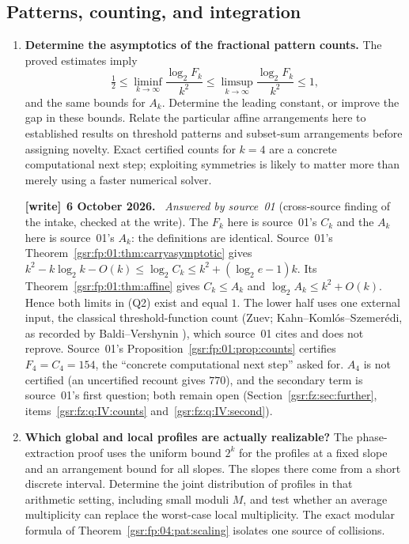 \documentclass[11pt,letterpaper]{article}
\numberwithin{equation}{section}
\theoremstyle{definition}
\theoremstyle{remark}
\newcommand{\1}{\mathbf 1}
\newenvironment{writenote}[1][]{\par\smallskip\begingroup\small
 \noindent\textbf{[write]}\if\relax\detokenize{#1}\relax\else~\textbf{#1.}\fi\ }%
 {\par\endgroup\smallskip}
\begin{document}
\subsection{Patterns, counting, and integration}

\begin{enumerate}[label=\textbf{Q\arabic*.},leftmargin=2.6em,resume]
\item \textbf{Determine the asymptotics of the fractional pattern counts.}
The proved estimates imply
\[
 \tfrac12
 \leq\liminf_{k\to\infty}\frac{\log_2 F_k}{k^2}
 \leq\limsup_{k\to\infty}\frac{\log_2 F_k}{k^2}
 \leq1,
 \tag{Q2}
\]
and the same bounds for \(A_k\).
Determine the leading constant, or improve the gap in these bounds.
Relate the particular affine arrangements here to established results
on threshold patterns and subset-sum arrangements before assigning
novelty.  Exact certified counts for \(k=4\) are a concrete computational
next step; exploiting symmetries is likely to matter more than merely
using a faster numerical solver.
\begin{writenote}[6 October 2026]
\emph{Answered by source~01} (cross-source finding of the intake, checked at the write). The $F_k$ here is source~01's $C_k$ and the $A_k$ here is source~01's $A_k$: the definitions are identical. Source~01's Theorem~\ref{gsr:fp:01:thm:carryasymptotic} gives $k^2-k\log_2k-O(k)\le\log_2C_k\le k^2+(\log_2e-1)k$. Its Theorem~\ref{gsr:fp:01:thm:affine} gives $C_k\le A_k$ and $\log_2A_k\le k^2+O(k)$. Hence both limits in (Q2) exist and equal $1$. The lower half uses one external input, the classical threshold-function count (Zuev; Kahn--Koml\'os--Szemer\'edi, as recorded by Baldi--Vershynin \cite{bv}), which source~01 cites and does not reprove. Source~01's Proposition~\ref{gsr:fp:01:prop:counts} certifies $F_4=C_4=154$, the ``concrete computational next step'' asked for. $A_4$ is not certified (an uncertified recount gives $770$), and the secondary term is source~01's first question; both remain open (Section~\ref{gsr:fz:sec:further}, items~\ref{gsr:fz:q:IV:counts} and~\ref{gsr:fz:q:IV:second}).
\end{writenote}

\item \textbf{Which global and local profiles are actually realizable?}
The phase-extraction proof uses the uniform bound \(2^k\) for the
profiles at a fixed slope and an arrangement bound for all slopes.
The slopes there come from a short discrete interval.  Determine the
joint distribution of profiles in that arithmetic setting, including
small moduli \(M\), and test whether an average multiplicity can replace
the worst-case local multiplicity.  The exact modular formula of
Theorem~\ref{gsr:fp:04:pat:scaling} isolates one source of collisions.


\end{enumerate}
\end{document}
